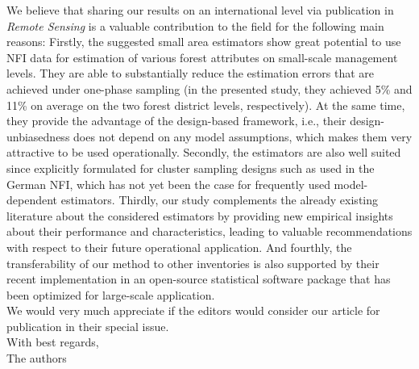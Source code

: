 \documentclass{article}
\begin{document}
We believe that sharing our results on an international level via publication in \textit{Remote Sensing} is a valuable contribution to the field for the following main reasons: Firstly, the suggested small area estimators show great potential to use NFI data for estimation of various forest attributes on small-scale management levels. They are able to substantially reduce the estimation errors that are achieved under one-phase sampling (in the presented study, they achieved 5\% and 11\% on average on the two forest district levels, respectively). At the same time, they provide the advantage of the design-based framework, i.e., their design-unbiasedness does not depend on any model assumptions, which makes them very attractive to be used operationally. Secondly, the estimators are also well suited since explicitly formulated for cluster sampling designs such as used in the German NFI, which has not yet been the case for frequently used model-dependent estimators. Thirdly, our study complements the already existing literature about the considered estimators by providing new empirical insights about their performance and characteristics, leading to valuable recommendations with respect to their future operational application. And fourthly, the transferability of our method to other inventories is also supported by their recent implementation in an open-source statistical software package \citep{forestinventory} that has been optimized for large-scale application.\\

We would very much appreciate if the editors would consider our article for publication in their special issue.\\

With best regards,\\

The authors\\ \\

\newpage
\thispagestyle{empty}


% 



\end{document}
